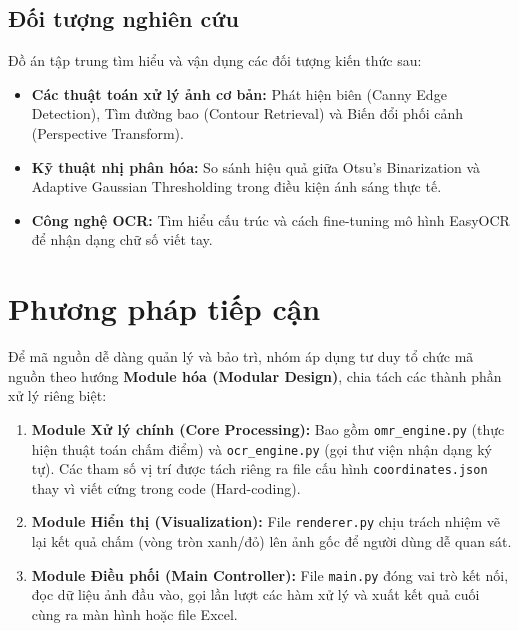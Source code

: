 \documentclass[6pt, a4paper]{report}
\begin{document}
	\subsection{Đối tượng nghiên cứu}
	Đồ án tập trung tìm hiểu và vận dụng các đối tượng kiến thức sau:
	\begin{itemize}
		\item \textbf{Các thuật toán xử lý ảnh cơ bản:} Phát hiện biên (Canny Edge Detection), Tìm đường bao (Contour Retrieval) và Biến đổi phối cảnh (Perspective Transform).
		\item \textbf{Kỹ thuật nhị phân hóa:} So sánh hiệu quả giữa Otsu's Binarization và Adaptive Gaussian Thresholding trong điều kiện ánh sáng thực tế.
		\item \textbf{Công nghệ OCR:} Tìm hiểu cấu trúc và cách fine-tuning mô hình EasyOCR để nhận dạng chữ số viết tay.
	\end{itemize}
	
	\section{Phương pháp tiếp cận}
	Để mã nguồn dễ dàng quản lý và bảo trì, nhóm áp dụng tư duy tổ chức mã nguồn theo hướng \textbf{Module hóa (Modular Design)}, chia tách các thành phần xử lý riêng biệt:
	\begin{enumerate}
		\item \textbf{Module Xử lý chính (Core Processing):} Bao gồm \texttt{omr\_engine.py} (thực hiện thuật toán chấm điểm) và \texttt{ocr\_engine.py} (gọi thư viện nhận dạng ký tự). Các tham số vị trí được tách riêng ra file cấu hình \texttt{coordinates.json} thay vì viết cứng trong code (Hard-coding).
		\item \textbf{Module Hiển thị (Visualization):} File \texttt{renderer.py} chịu trách nhiệm vẽ lại kết quả chấm (vòng tròn xanh/đỏ) lên ảnh gốc để người dùng dễ quan sát.
		\item \textbf{Module Điều phối (Main Controller):} File \texttt{main.py} đóng vai trò kết nối, đọc dữ liệu ảnh đầu vào, gọi lần lượt các hàm xử lý và xuất kết quả cuối cùng ra màn hình hoặc file Excel.
	\end{enumerate}
	
\end{document}
